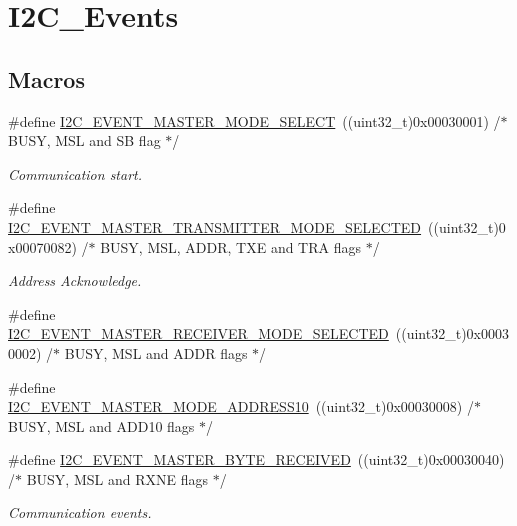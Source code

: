 \hypertarget{group___i2_c___events}{}\section{I2\+C\+\_\+\+Events}
\label{group___i2_c___events}
\subsection*{Macros}
\begin{DoxyCompactItemize}
\item 
\#define \mbox{\hyperlink{group___i2_c___events_gaeef8c22ac035122b06e31b360ac7aeb3}{I2\+C\+\_\+\+E\+V\+E\+N\+T\+\_\+\+M\+A\+S\+T\+E\+R\+\_\+\+M\+O\+D\+E\+\_\+\+S\+E\+L\+E\+CT}}~((uint32\+\_\+t)0x00030001)  /$\ast$ B\+U\+S\+Y, M\+S\+L and S\+B flag $\ast$/
\begin{DoxyCompactList}\small\item\em Communication start. \end{DoxyCompactList}\item 
\#define \mbox{\hyperlink{group___i2_c___events_ga2361a6e60b7dc86fb682dd06fbd3edb7}{I2\+C\+\_\+\+E\+V\+E\+N\+T\+\_\+\+M\+A\+S\+T\+E\+R\+\_\+\+T\+R\+A\+N\+S\+M\+I\+T\+T\+E\+R\+\_\+\+M\+O\+D\+E\+\_\+\+S\+E\+L\+E\+C\+T\+ED}}~((uint32\+\_\+t)0x00070082)  /$\ast$ B\+U\+S\+Y, M\+S\+L, A\+D\+D\+R, T\+X\+E and T\+R\+A flags $\ast$/
\begin{DoxyCompactList}\small\item\em Address Acknowledge. \end{DoxyCompactList}\item 
\#define \mbox{\hyperlink{group___i2_c___events_gabfde82864432ddb87b6462234d542e60}{I2\+C\+\_\+\+E\+V\+E\+N\+T\+\_\+\+M\+A\+S\+T\+E\+R\+\_\+\+R\+E\+C\+E\+I\+V\+E\+R\+\_\+\+M\+O\+D\+E\+\_\+\+S\+E\+L\+E\+C\+T\+ED}}~((uint32\+\_\+t)0x00030002)  /$\ast$ B\+U\+S\+Y, M\+S\+L and A\+D\+D\+R flags $\ast$/
\item 
\#define \mbox{\hyperlink{group___i2_c___events_gad04882597bbf542c6fee7a9c837fbc8c}{I2\+C\+\_\+\+E\+V\+E\+N\+T\+\_\+\+M\+A\+S\+T\+E\+R\+\_\+\+M\+O\+D\+E\+\_\+\+A\+D\+D\+R\+E\+S\+S10}}~((uint32\+\_\+t)0x00030008)  /$\ast$ B\+U\+S\+Y, M\+S\+L and A\+D\+D10 flags $\ast$/
\item 
\#define \mbox{\hyperlink{group___i2_c___events_ga6bcf2ae49961e07e27cf9fdf334719e3}{I2\+C\+\_\+\+E\+V\+E\+N\+T\+\_\+\+M\+A\+S\+T\+E\+R\+\_\+\+B\+Y\+T\+E\+\_\+\+R\+E\+C\+E\+I\+V\+ED}}~((uint32\+\_\+t)0x00030040)  /$\ast$ B\+U\+S\+Y, M\+S\+L and R\+X\+N\+E flags $\ast$/
\begin{DoxyCompactList}\small\item\em Communication events. \end{DoxyCompactList}\item 

\end{DoxyCompactItemize}
